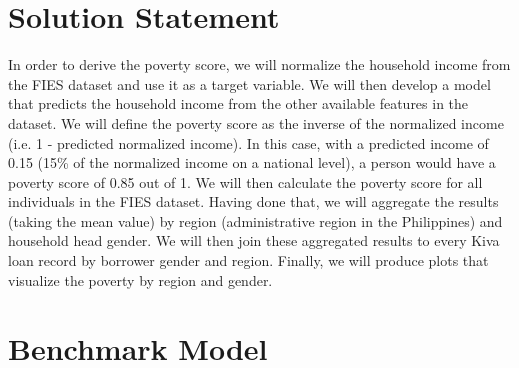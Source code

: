\documentclass{article}
\begin{document}
\section{Solution Statement}

In order to derive the poverty score, we will normalize the household income from the FIES dataset and use it as a target variable. We will then develop a model that predicts the household income from the other available features in the dataset. We will define the poverty score as the inverse of the normalized income (i.e. 1 - predicted normalized income). In this case, with a predicted income of 0.15 (15\% of the normalized income on a national level), a person would have a poverty score of 0.85 out of 1.
We will then calculate the poverty score for all individuals in the FIES dataset. Having done that, we will aggregate the results (taking the mean value) by region (administrative region in the Philippines) and household head gender. We will then join these aggregated results to every Kiva loan record by borrower gender and region.
Finally, we will produce plots that visualize the poverty by region and gender.
\hypertarget{benchmark}{\section{Benchmark Model}}
\end{document}
